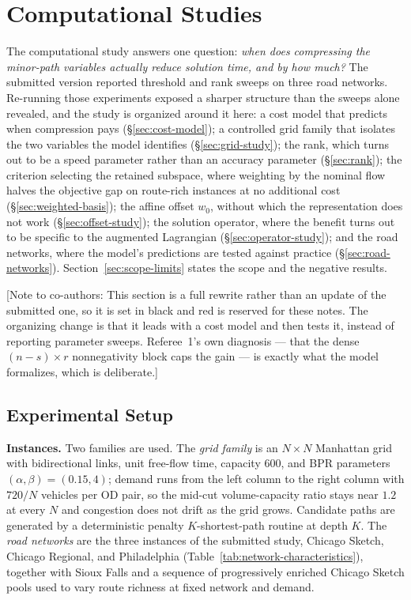 \documentclass[11pt]{article}
\newif\ifshownotes \shownotestrue
\newcommand{\conote}[1]{\ifshownotes{\color{red}\small\textsf{[Note to co-authors: #1]}}\fi}
\begin{document}
\section{Computational Studies}
\label{sec:experiments}
\label{sec:experiments}\label{sec:computational}


The computational study answers one question: \emph{when does compressing the minor-path
variables actually reduce solution time, and by how much?} The submitted version reported
threshold and rank sweeps on three road networks. Re-running those experiments exposed a
sharper structure than the sweeps alone revealed, and the study is organized around it here:
a cost model that predicts when compression pays (\S\ref{sec:cost-model}); a controlled grid
family that isolates the two variables the model identifies (\S\ref{sec:grid-study}); the
rank, which turns out to be a speed parameter rather than an accuracy parameter
(\S\ref{sec:rank}); the criterion selecting the retained subspace, where weighting by the
nominal flow halves the objective gap on route-rich instances at no additional cost
(\S\ref{sec:weighted-basis}); the affine offset $w_0$, without which the representation does not work
(\S\ref{sec:offset-study}); the solution operator, where the benefit turns out to be specific
to the augmented Lagrangian (\S\ref{sec:operator-study}); and the road networks, where the
model's predictions are tested against practice (\S\ref{sec:road-networks}).
Section~\ref{sec:scope-limits} states the scope and the negative results.

\conote{This section is a full rewrite rather than an update of the submitted one, so it is
set in black and red is reserved for these notes. The organizing change is that it leads with
a cost model and then tests it, instead of reporting parameter sweeps. Referee~1's own
diagnosis --- that the dense $(n-s)\times r$ nonnegativity block caps the gain --- is exactly
what the model formalizes, which is deliberate.}


\subsection{Experimental Setup}
\label{sec:setup}


\textbf{Instances.} Two families are used. The \emph{grid family} is an $N\times N$
Manhattan grid with bidirectional links, unit free-flow time, capacity $600$, and BPR
parameters $(\alpha,\beta)=(0.15,4)$; demand runs from the left column to the right column
with $720/N$ vehicles per OD pair, so the mid-cut volume-capacity ratio stays near $1.2$ at
every $N$ and congestion does not drift as the grid grows. Candidate paths are generated by
a deterministic penalty $K$-shortest-path routine at depth $K$. The \emph{road networks} are
the three instances of the submitted study, Chicago Sketch, Chicago Regional, and
Philadelphia (Table~\ref{tab:network-characteristics}), together with Sioux Falls and a
sequence of progressively enriched Chicago Sketch pools used to vary route richness at fixed
network and demand.
\end{document}
